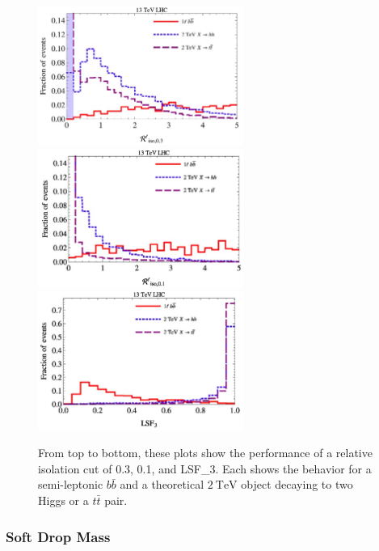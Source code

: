 \begin{figure}[!tp]
    \centering
    \includegraphics[width=0.6\textwidth]{figures/RelIso0_3.png}
    \includegraphics[width=0.6\textwidth]{figures/RelIso0_1.png}
    \includegraphics[width=0.6\textwidth]{figures/LSF_paper_plot.png}
    \caption[
        LSF performance compared to relative isolation
    ]    
    {
        From top to bottom, these plots show the performance of a relative isolation cut of 0.3, 0.1, and LSF_{3}.  Each shows the behavior for a semi-leptonic \ensuremath{b\bar{b}} and a theoretical \ensuremath{\SI{2}{\TeV}} object decaying to two Higgs or a \ensuremath{t\bar{t}} pair.
    }
    \label{fig:LSFvRelIso}

\end{figure}

\subsubsection{Soft Drop Mass}

